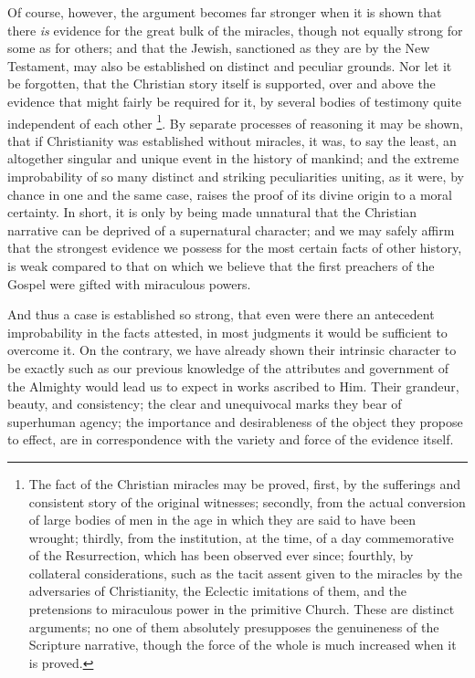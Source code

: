 Of course, however, the argument becomes far
stronger when it is shown that there \emph{is} evidence for the great bulk of
the miracles, though not equally strong for some as for others; and
that the Jewish, sanctioned as they are by the New Testament, may also
be established on distinct and peculiar grounds. Nor let it be
forgotten, that the Christian story itself is supported, over and
above the evidence that might fairly be required for it, by several
bodies of testimony quite independent of each other \footnote{The fact of the Christian miracles may be proved, first, by the
sufferings and consistent story of the original witnesses; secondly,
from the actual conversion of large bodies of men in the age in which
they are said to have been wrought; thirdly, from the institution, at
the time, of a day commemorative of the Resurrection, which has been
observed ever since; fourthly, by collateral considerations, such as
the tacit assent given to the miracles by the adversaries of
Christianity, the Eclectic imitations of them, and the pretensions to
miraculous power in the primitive Church. These are distinct
arguments; no one of them absolutely presupposes the genuineness of
the Scripture narrative, though the force of the whole is much
increased when it is proved.}. By separate processes of reasoning it may be shown, that
if Christianity was established without miracles, it was, to say the
least, an altogether singular and unique event in the history of
mankind; and the extreme improbability of so many distinct and
striking peculiarities uniting, as it were, by chance in one and the
same case, raises the proof of its divine origin to a moral certainty.
In short, it is only by being made unnatural that the Christian
narrative can be deprived of a supernatural character; and we may
safely affirm that the strongest evidence we possess for the most
certain facts of other history, is weak compared to that on which we
believe that the first preachers of the Gospel were gifted with
miraculous powers.

And thus a case is established so strong, that
even were there an antecedent improbability in the facts attested, in
most judgments it would be sufficient to overcome it. On the contrary,
we have already shown their intrinsic character to be exactly such as
our previous knowledge of the attributes and government of the
Almighty would lead us to expect in works ascribed to Him. Their
grandeur, beauty, and consistency; the clear and unequivocal marks
they bear of superhuman agency; the importance and desirableness of
the object they propose to effect, are in correspondence with the
variety and force of the evidence itself.


